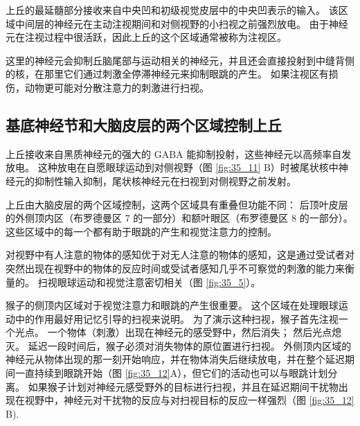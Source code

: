 上丘的最延髓部分接收来自中央凹和初级视觉皮层中的中央凹表示的输入。
该区域中间层的神经元在主动注视期间和对侧视野的小扫视之前强烈放电。
由于神经元在注视过程中很活跃，因此上丘的这个区域通常被称为注视区。


这里的神经元会抑制丘脑尾部与运动相关的神经元，并且还会直接投射到中缝背侧的核，在那里它们通过刺激全停滞神经元来抑制眼跳的产生。
如果注视区有损伤，动物更可能对分散注意力的刺激进行扫视。


\subsection{基底神经节和大脑皮层的两个区域控制上丘}

上丘接收来自黑质神经元的强大的 GABA 能抑制投射，这些神经元以高频率自发放电。
这种放电在自愿眼球运动到对侧视野（图 \ref{fig:35_11} B）时被尾状核中神经元的抑制性输入抑制，尾状核神经元在扫视到对侧视野之前发射。


上丘由大脑皮层的两个区域控制，这两个区域具有重叠但功能不同：
后顶叶皮层的外侧顶内区（布罗德曼区 7 的一部分）和额叶眼区（布罗德曼区 8 的一部分）。 
这些区域中的每一个都有助于眼跳的产生和视觉注意力的控制。


对视野中有人注意的物体的感知优于对无人注意的物体的感知，这是通过受试者对突然出现在视野中的物体的反应时间或受试者感知几乎不可察觉的刺激的能力来衡量的。
扫视眼球运动和视觉注意密切相关（图 \ref{fig:35_5}）。


猴子的侧顶内区域对于视觉注意力和眼跳的产生很重要。
这个区域在处理眼球运动中的作用最好用记忆引导的扫视来说明。
为了演示这种扫视，猴子首先注视一个光点。
一个物体（刺激）出现在神经元的感受野中，然后消失； 然后光点熄灭。
延迟一段时间后，猴子必须对消失物体的原位置进行扫视。
外侧顶内区域的神经元从物体出现的那一刻开始响应，并在物体消失后继续放电，并在整个延迟期间一直持续到眼跳开始（图 \ref{fig:35_12}A），但它们的活动也可以与眼跳计划分离。
如果猴子计划对神经元感受野外的目标进行扫视，并且在延迟期间干扰物出现在视野中，神经元对干扰物的反应与对扫视目标的反应一样强烈（图 \ref{fig:35_12} B).


